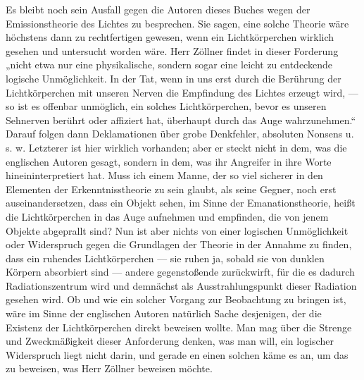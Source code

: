 \documentclass[a4paper, 11pt, oneside, german]{article}
\begin{document}
Es bleibt noch sein Ausfall gegen die Autoren dieses Buches wegen der Emissionstheorie des Lichtes zu besprechen. Sie sagen, eine solche Theorie wäre höchstens dann zu rechtfertigen gewesen, wenn ein Lichtkörperchen wirklich gesehen und untersucht worden wäre. Herr Zöllner findet in dieser Forderung „nicht etwa nur eine physikalische, sondern sogar eine leicht zu entdeckende logische Unmöglichkeit. In der Tat, wenn in uns erst durch die Berührung der Lichtkörperchen mit unseren Nerven die Empfindung des Lichtes erzeugt wird, --- so ist es offenbar unmöglich, ein solches Lichtkörperchen, bevor es unseren Sehnerven berührt oder affiziert hat, überhaupt durch das Auge wahrzunehmen.“ Darauf folgen dann Deklamationen über grobe Denkfehler, absoluten Nonsens u. s. w. Letzterer ist hier wirklich vorhanden; aber er steckt nicht in dem, was die englischen Autoren gesagt, sondern in dem, was ihr Angreifer in ihre Worte hineininterpretiert hat. Muss ich einem Manne, der so viel sicherer in den Elementen der Erkenntnisstheorie zu sein glaubt, als seine Gegner, noch erst auseinandersetzen, dass ein Objekt sehen, im Sinne der Emanationstheorie, heißt die Lichtkörperchen in das Auge aufnehmen und empfinden, die von jenem Objekte abgeprallt sind? Nun ist aber nichts von einer logischen Unmöglichkeit oder Widerspruch gegen die Grundlagen der Theorie in der Annahme zu finden, dass ein ruhendes Lichtkörperchen --- sie ruhen ja, sobald sie von dunklen Körpern absorbiert sind --- andere gegenstoßende zurückwirft, für die es dadurch Radiationszentrum wird und demnächst als Ausstrahlungspunkt dieser Radiation gesehen wird. Ob und wie ein solcher Vorgang zur Beobachtung zu bringen ist, wäre im Sinne der englischen Autoren natürlich Sache desjenigen, der die Existenz der Lichtkörperchen direkt beweisen wollte. Man mag über die Strenge und Zweckmäßigkeit dieser Anforderung denken, was man will, ein logischer Widerspruch liegt nicht darin, und gerade en einen solchen käme es an, um das zu beweisen, was Herr Zöllner beweisen möchte.
\end{document}
